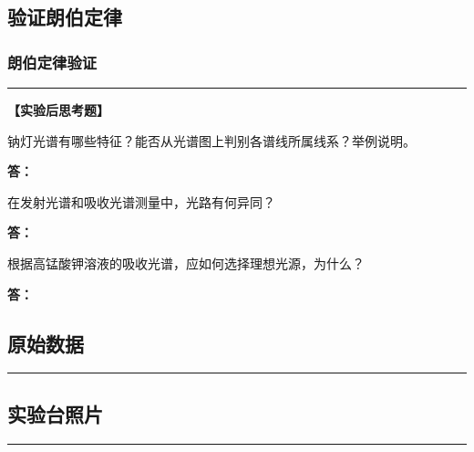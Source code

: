 \documentclass[dvipsnames, svgnames,a4paper,11pt]{article}
\newcommand{\answerblank}[1][3.8cm]{%
  \par\nopagebreak[4]\noindent\textbf{答：}\par\nopagebreak[4]\vspace*{#1}}
\newcommand{\recordblank}[1]{%
  \par\noindent\rule{0.95\linewidth}{0pt}\rule{0pt}{#1}\par}
\begin{document}
\subsection{验证朗伯定律}
\subsubsection{朗伯定律验证}
\recordblank{3.2cm}
\textbf{【实验后思考题】}


\begin{question}
钠灯光谱有哪些特征？能否从光谱图上判别各谱线所属线系？举例说明。
\end{question}
\answerblank[3.8cm]
\begin{question}
	在发射光谱和吸收光谱测量中，光路有何异同？
\end{question}
\answerblank[3.8cm]
\begin{question}
	根据高锰酸钾溶液的吸收光谱，应如何选择理想光源，为什么？
\end{question}
\answerblank[3.8cm]
\clearpage


\clearpage
\appendix
\appendixpage
\addappheadtotoc
\subsection{原始数据}
\recordblank{5cm}

\subsection{实验台照片}
\recordblank{5.5cm}
\end{document}
